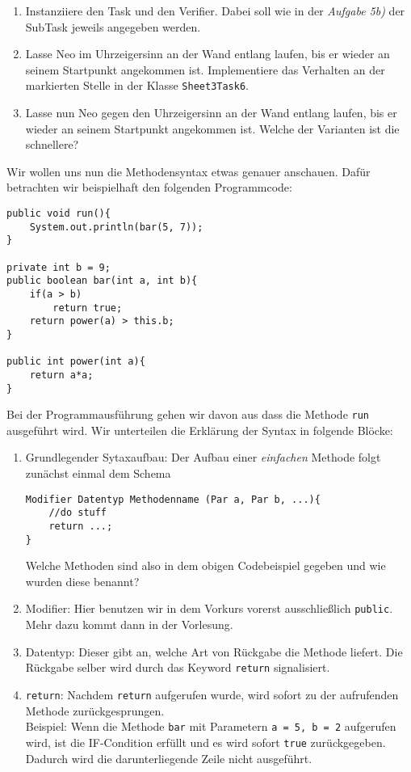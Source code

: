 
\begin{enumerate}[label=\alph*)]
    \item Instanziiere den Task und den Verifier. Dabei soll wie in der \textit{Aufgabe 5b)} der SubTask jeweils angegeben werden.
    \item Lasse Neo im Uhrzeigersinn an der Wand entlang laufen, bis er wieder an seinem Startpunkt angekommen ist.
    Implementiere das Verhalten an der markierten Stelle in der Klasse \lstinline{Sheet3Task6}.
    \item Lasse nun Neo gegen den Uhrzeigersinn an der Wand entlang laufen, bis er wieder an seinem Startpunkt angekommen ist.
    Welche der Varianten ist die schnellere?
\end{enumerate}
\begin{Infobox}[Methodensyntax]
    Wir wollen uns nun die Methodensyntax etwas genauer anschauen. Dafür betrachten wir beispielhaft den folgenden Programmcode:
    \begin{lstlisting}[breaklines=true, numbers=none]
public void run(){
    System.out.println(bar(5, 7));
}

private int b = 9;
public boolean bar(int a, int b){
    if(a > b)
        return true;
    return power(a) > this.b;
}

public int power(int a){
    return a*a;
}
\end{lstlisting}
Bei der Programmausführung gehen wir davon aus dass die Methode \lstinline{run} ausgeführt wird. Wir unterteilen die Erklärung der Syntax in folgende Blöcke:
\begin{enumerate}[label=\roman*)]
    \item 
    Grundlegender Sytaxaufbau: Der Aufbau einer \textit{einfachen} Methode folgt zunächst einmal dem Schema 
    \begin{lstlisting}
Modifier Datentyp Methodenname (Par a, Par b, ...){
    //do stuff
    return ...;
}
    \end{lstlisting}
    Welche Methoden sind also in dem obigen Codebeispiel gegeben und wie wurden diese benannt?
    \item Modifier: Hier benutzen wir in dem Vorkurs vorerst ausschließlich \lstinline{public}. Mehr dazu kommt dann in der Vorlesung.
    \item Datentyp: Dieser gibt an, welche Art von Rückgabe die Methode liefert. Die Rückgabe selber wird durch das Keyword \lstinline{return} signalisiert.
    \item \lstinline{return}:
    Nachdem \lstinline{return} aufgerufen wurde, wird sofort zu der aufrufenden Methode zurückgesprungen.\\
    Beispiel: Wenn die Methode \lstinline{bar} mit Parametern \lstinline{a = 5, b = 2} aufgerufen wird, ist die IF-Condition erfüllt und es wird sofort \lstinline{true} zurückgegeben.
    Dadurch wird die darunterliegende Zeile nicht ausgeführt.
\end{enumerate}

\end{Infobox}
